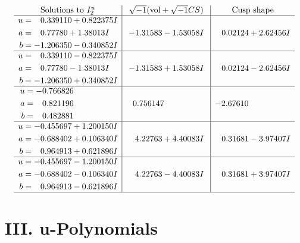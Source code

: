 \documentclass[1p]{elsarticle_modified}
\theoremstyle{definition}
\newcommand{\I}{\sqrt{-1}}
\begin{document}
$$\begin{array}{c|c|c}  
\text{Solutions to }I^u_{2}& \I (\text{vol} + \sqrt{-1}CS) & \text{Cusp shape}\\
 \hline 
\begin{aligned}
u &= \phantom{-}0.339110 + 0.822375 I \\
a &= \phantom{-}0.77780 + 1.38013 I \\
b &= -1.206350 - 0.340852 I\end{aligned}
 & -1.31583 - 1.53058 I & \phantom{-}0.02124 + 2.62456 I \\ \hline\begin{aligned}
u &= \phantom{-}0.339110 - 0.822375 I \\
a &= \phantom{-}0.77780 - 1.38013 I \\
b &= -1.206350 + 0.340852 I\end{aligned}
 & -1.31583 + 1.53058 I & \phantom{-}0.02124 - 2.62456 I \\ \hline\begin{aligned}
u &= -0.766826\phantom{ +0.000000I} \\
a &= \phantom{-}0.821196\phantom{ +0.000000I} \\
b &= \phantom{-}0.482881\phantom{ +0.000000I}\end{aligned}
 & \phantom{-}0.756147\phantom{ +0.000000I} & -2.67610\phantom{ +0.000000I} \\ \hline\begin{aligned}
u &= -0.455697 + 1.200150 I \\
a &= -0.688402 + 0.106340 I \\
b &= \phantom{-}0.964913 + 0.621896 I\end{aligned}
 & \phantom{-}4.22763 + 4.40083 I & \phantom{-}0.31681 - 3.97407 I \\ \hline\begin{aligned}
u &= -0.455697 - 1.200150 I \\
a &= -0.688402 - 0.106340 I \\
b &= \phantom{-}0.964913 - 0.621896 I\end{aligned}
 & \phantom{-}4.22763 - 4.40083 I & \phantom{-}0.31681 + 3.97407 I\\
 \hline 
 \end{array}$$\newpage
\newpage\renewcommand{\arraystretch}{1}
\centering \section*{ III. u-Polynomials}
\end{document}
